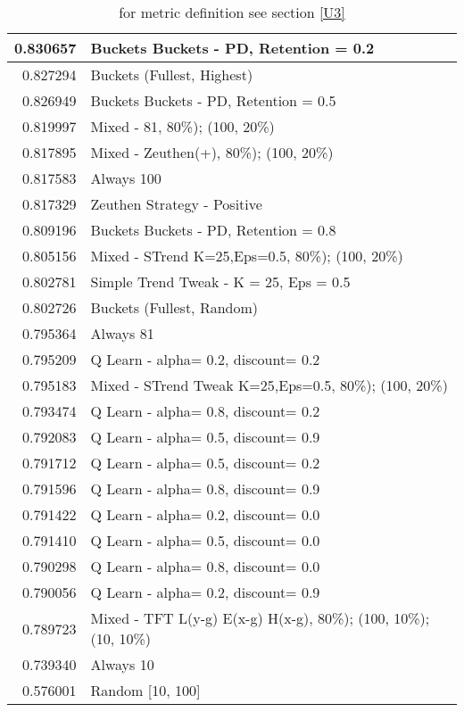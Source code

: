 \begin{table}[!hbtp]
\begin{footnotesize}
\begin{tabular}{|r|l|}
0.830657 & Buckets Buckets - PD, Retention = 0.2\\ \hline
0.827294 & Buckets (Fullest, Highest)\\ \hline
0.826949 & Buckets Buckets - PD, Retention = 0.5\\ \hline
0.819997 & Mixed - {81, 80\%); (100, 20\%)}\\ \hline
0.817895 & Mixed - {Zeuthen(+), 80\%); (100, 20\%)}\\ \hline
0.817583 & Always 100\\ \hline
0.817329 & Zeuthen Strategy - Positive\\ \hline
0.809196 & Buckets Buckets - PD, Retention = 0.8\\ \hline
0.805156 & Mixed - {STrend K=25,Eps=0.5, 80\%); (100, 20\%)}\\ \hline
0.802781 & Simple Trend Tweak - K = 25, Eps = 0.5\\ \hline
0.802726 & Buckets (Fullest, Random)\\ \hline
0.795364 & Always 81\\ \hline
0.795209 & Q Learn - alpha= 0.2, discount= 0.2\\ \hline
0.795183 & Mixed - {STrend Tweak K=25,Eps=0.5, 80\%); (100, 20\%)}\\ \hline
0.793474 & Q Learn - alpha= 0.8, discount= 0.2\\ \hline
0.792083 & Q Learn - alpha= 0.5, discount= 0.9\\ \hline
0.791712 & Q Learn - alpha= 0.5, discount= 0.2\\ \hline
0.791596 & Q Learn - alpha= 0.8, discount= 0.9\\ \hline
0.791422 & Q Learn - alpha= 0.2, discount= 0.0\\ \hline
0.791410 & Q Learn - alpha= 0.5, discount= 0.0\\ \hline
0.790298 & Q Learn - alpha= 0.8, discount= 0.0\\ \hline
0.790056 & Q Learn - alpha= 0.2, discount= 0.9\\ \hline
0.789723 & Mixed - {TFT L(y-g) E(x-g) H(x-g), 80\%); (100, 10\%); (10, 10\%)}\\ \hline
0.739340 & Always 10\\ \hline
0.576001 & Random [10, 100]\\ \hline
\end{tabular}
\caption{for metric definition see section \eqref{U3}}
\end{footnotesize}
\end{table}

